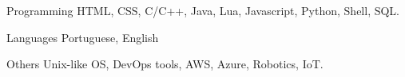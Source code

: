 

\begin{cvskills}

  \cvskill
    {Programming} %
    {HTML, CSS, C/C++, Java, Lua, Javascript, Python, Shell, SQL.} %

%
  \cvskill
    {Languages} %
    {Portuguese, English} %

  \cvskill
    {Others} %
    {Unix-like OS, DevOps tools, AWS, Azure, Robotics, IoT.} %

\end{cvskills}
